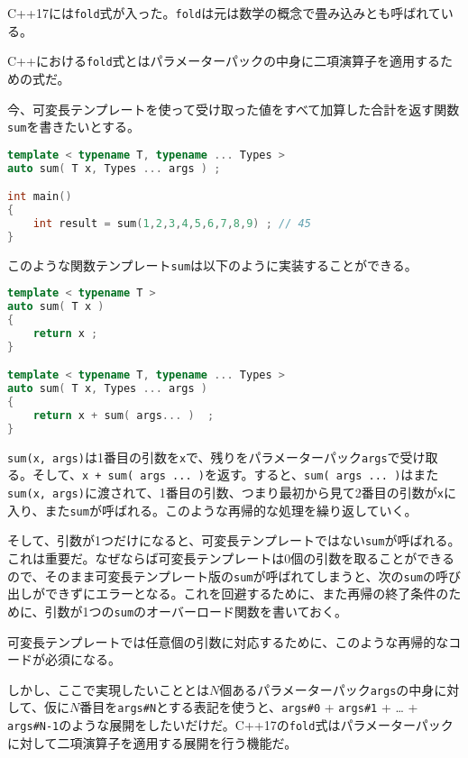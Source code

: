 %

C++17には\lstinline!fold!式が入った。\lstinline!fold!は元は数学の概念で畳み込みとも呼ばれている。

C++における\lstinline!fold!式とはパラメーターパックの中身に二項演算子を適用するための式だ。

今、可変長テンプレートを使って受け取った値をすべて加算した合計を返す関数\lstinline!sum!を書きたいとする。

\begin{lstlisting}[language=C++]
template < typename T, typename ... Types >
auto sum( T x, Types ... args ) ;

int main()
{
    int result = sum(1,2,3,4,5,6,7,8,9) ; // 45
}
\end{lstlisting}

このような関数テンプレート\lstinline!sum!は以下のように実装することができる。

\begin{lstlisting}[language=C++]
template < typename T >
auto sum( T x )
{
    return x ;
}

template < typename T, typename ... Types >
auto sum( T x, Types ... args )
{
    return x + sum( args... )  ;
}
\end{lstlisting}

\lstinline!sum(x, args)!は1番目の引数を\lstinline!x!で、残りをパラメーターパック\lstinline!args!で受け取る。そして、\lstinline!x + sum( args ... )!を返す。すると、\lstinline!sum( args ... )!はまた\lstinline!sum(x, args)!に渡されて、1番目の引数、つまり最初から見て2番目の引数が\lstinline!x!に入り、また\lstinline!sum!が呼ばれる。このような再帰的な処理を繰り返していく。

そして、引数が1つだけになると、可変長テンプレートではない\lstinline!sum!が呼ばれる。これは重要だ。なぜならば可変長テンプレートは0個の引数を取ることができるので、そのまま可変長テンプレート版の\lstinline!sum!が呼ばれてしまうと、次の\lstinline!sum!の呼び出しができずにエラーとなる。これを回避するために、また再帰の終了条件のために、引数が1つの\lstinline!sum!のオーバーロード関数を書いておく。

可変長テンプレートでは任意個の引数に対応するために、このような再帰的なコードが必須になる。

しかし、ここで実現したいこととは\(N\)個あるパラメーターパック\lstinline!args!の中身に対して、仮に\(N\)番目を\lstinline!args#N!とする表記を使うと、\lstinline!args#0!
+ \lstinline!args#1! + \ldots{} +
\lstinline!args#N-1!のような展開をしたいだけだ。C++17の\lstinline!fold!式はパラメーターパックに対して二項演算子を適用する展開を行う機能だ。


